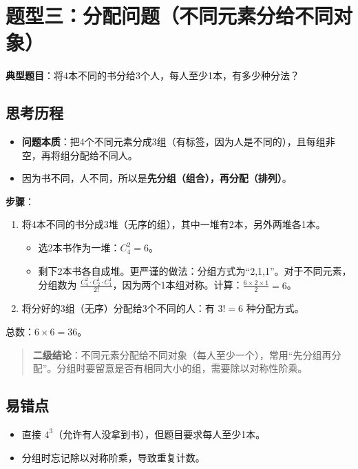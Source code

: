 \documentclass[10pt]{article}
\begin{document}
\section{题型三：分配问题（不同元素分给不同对象）}

\textbf{典型题目}：将4本不同的书分给3个人，每人至少1本，有多少种分法？

\subsection*{思考历程}
\begin{itemize}
\item \textbf{问题本质}：把4个不同元素分成3组（有标签，因为人是不同的），且每组非空，再将组分配给不同人。
\item 因为书不同，人不同，所以是\textbf{先分组（组合），再分配（排列）}。
\end{itemize}

\textbf{步骤}：
\begin{enumerate}
\item 将4本不同的书分成3堆（无序的组），其中一堆有2本，另外两堆各1本。
\begin{itemize}
\item 选2本书作为一堆：\(C_4^2 = 6\)。
\item 剩下2本书各自成堆。更严谨的做法：分组方式为“2,1,1”。对于不同元素，分组数为 \(\frac{C_4^2 \cdot C_2^1 \cdot C_1^1}{2!}\)，因为两个1本组对称。计算：\(\frac{6 \times 2 \times 1}{2} = 6\)。
\end{itemize}
\item 将分好的3组（无序）分配给3个不同的人：有 \(3! = 6\) 种分配方式。
\end{enumerate}
总数：\(6 \times 6 = 36\)。

\begin{quote}
\textbf{二级结论}：不同元素分配给不同对象（每人至少一个），常用“先分组再分配”。分组时要留意是否有相同大小的组，需要除以对称性阶乘。
\end{quote}

\subsection*{易错点}
\begin{itemize}
\item 直接 \(4^3\)（允许有人没拿到书），但题目要求每人至少1本。
\item 分组时忘记除以对称阶乘，导致重复计数。
\end{itemize}
\end{document}
